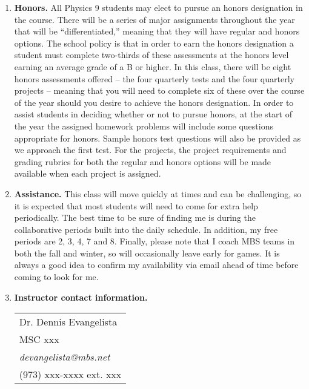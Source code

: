 \documentclass{article}
\begin{document}
\begin{enumerate}
\item \textbf{Honors.} All Physics 9 students may elect to pursue an honors designation in the course. There will be a series of major assignments throughout the year that will be ``differentiated,'' meaning that they will have regular and honors options. The school policy is that in order to earn the honors designation a student must complete two-thirds of these assessments at the honors level earning an average grade of a B or higher. In this class, there will be eight honors assessments offered -- the four quarterly tests and the four quarterly projects -- meaning that you will need to complete six of these over the course of the year should you desire to achieve the honors designation. In order to assist students in deciding whether or not to pursue honors, at the start of the year the assigned homework problems will include some questions appropriate for honors. Sample honors test questions will also be provided as we approach the first test. For the projects, the project requirements and grading rubrics for both the regular and honors options will be made available when each project is assigned.

\item \textbf{Assistance.} This class will move quickly at times and can be challenging, so it is expected that most students will need to come for extra help periodically. The best time to be sure of finding me is during the collaborative periods built into the daily schedule. In addition, my free periods are 2, 3, 4, 7 and 8. Finally, please note that I coach MBS teams in both the fall and winter, so will occasionally leave early for games. It is always a good idea to confirm my availability via email ahead of time before coming to look for me.

\item \textbf{Instructor contact information.}
\begin{table}[h]
\hspace{3in}\begin{tabular}{l}
Dr. Dennis Evangelista \\
MSC xxx \\
\emph{devangelista@mbs.net} \\
(973) xxx-xxxx ext. xxx\\
\end{tabular}
\end{table}
\end{enumerate}

\end{document}
